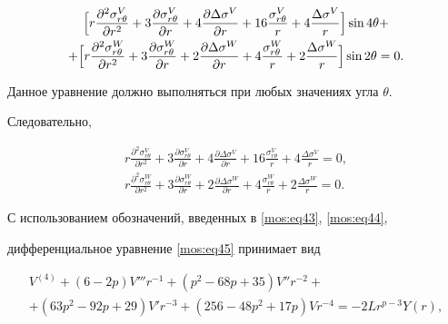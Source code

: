\begin{multline*}

\Bigl[r\frac{\partial^2 \sigma_{r\theta}^V}{\partial r^2}+3\frac{\partial\sigma_{r\theta}^V}{\partial r}+4\frac{\partial\Delta\sigma^V}{\partial r}+16\frac{\sigma_{r\theta}^V}{r}+4\frac{\Delta\sigma^V}{r}\Bigr]\sin{4\theta}+

\\+

\Bigl[r\frac{\partial^2 \sigma_{r\theta}^W}{\partial r^2}+3\frac{\partial\sigma_{r\theta}^W}{\partial r}+2\frac{\partial\Delta\sigma^W}{\partial r}

+4\frac{\sigma_{r\theta}^W}{r}+2\frac{\Delta\sigma^W}{r}\Bigr]\sin{2\theta}=0.

\end{multline*}

Данное уравнение должно выполняться при любых значениях угла $\theta$.

Следовательно, 

\begin{gather}

\label{mos:eq45}

r\frac{\partial^2 \sigma_{r\theta}^V}{\partial r^2}+3\frac{\partial\sigma_{r\theta}^V}{\partial r}+4\frac{\partial\Delta\sigma^V}{\partial r}+16\frac{\sigma_{r\theta}^V}{r}+4\frac{\Delta\sigma^V}{r}=0,

\\

\label{mos:eq46}

r\frac{\partial^2 \sigma_{r\theta}^W}{\partial r^2}+3\frac{\partial\sigma_{r\theta}^W}{\partial r}+2\frac{\partial\Delta\sigma^W}{\partial r}

+4\frac{\sigma_{r\theta}^W}{r}+2\frac{\Delta\sigma^W}{r}=0.

\end{gather}



С использованием обозначений, введенных в \eqref{mos:eq43}, \eqref{mos:eq44},  

дифференциальное уравнение \eqref{mos:eq45} принимает вид

\begin{multline}

\label{mos:eq47}

V^{(4)}+(6-2p)V'''r^{-1}+(p^2-68p+35)V'' r^{-2}+\\+

(63p^2-92p+29)V' r^{-3}+(256-48p^2+17p)Vr^{-4}=-2Lr^{p-3}Y(r),

\end{multline}

